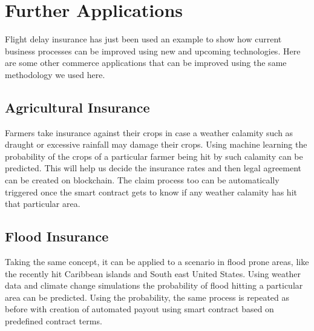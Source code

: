 \section{Further Applications}
Flight delay insurance has just been used an example to show how current business processes can be improved using new and upcoming technologies. Here are some other commerce applications that can be improved using the same methodology we used here.

\subsection{Agricultural Insurance}
Farmers take insurance against their crops in case a weather calamity such as draught or excessive rainfall may damage their crops. Using machine learning the probability of the crops of a particular farmer being hit by such calamity can be predicted. This will help us decide the insurance rates and then legal agreement can be created on blockchain. The claim process too can be automatically triggered once the smart contract gets to know if any weather calamity has hit that particular area.

\subsection{Flood Insurance}
Taking the same concept, it can be applied to a scenario in flood prone areas, like the recently hit Caribbean islands and South east United States. Using weather data and climate change simulations the probability of flood hitting a particular area can be predicted. Using the probability, the same process is repeated as before with creation of automated payout using smart contract based on predefined contract terms.
